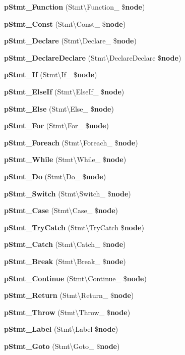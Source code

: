 \begin{DoxyCompactItemize}
\item 
{\bf p\+Stmt\+\_\+\+Function} (Stmt\textbackslash{}\+Function\+\_\+ \${\bf node})
\item 
{\bf p\+Stmt\+\_\+\+Const} (Stmt\textbackslash{}\+Const\+\_\+ \${\bf node})
\item 
{\bf p\+Stmt\+\_\+\+Declare} (Stmt\textbackslash{}\+Declare\+\_\+ \${\bf node})
\item 
{\bf p\+Stmt\+\_\+\+Declare\+Declare} (Stmt\textbackslash{}\+Declare\+Declare \${\bf node})
\item 
{\bf p\+Stmt\+\_\+\+If} (Stmt\textbackslash{}\+If\+\_\+ \${\bf node})
\item 
{\bf p\+Stmt\+\_\+\+Else\+If} (Stmt\textbackslash{}\+Else\+If\+\_\+ \${\bf node})
\item 
{\bf p\+Stmt\+\_\+\+Else} (Stmt\textbackslash{}\+Else\+\_\+ \${\bf node})
\item 
{\bf p\+Stmt\+\_\+\+For} (Stmt\textbackslash{}\+For\+\_\+ \${\bf node})
\item 
{\bf p\+Stmt\+\_\+\+Foreach} (Stmt\textbackslash{}\+Foreach\+\_\+ \${\bf node})
\item 
{\bf p\+Stmt\+\_\+\+While} (Stmt\textbackslash{}\+While\+\_\+ \${\bf node})
\item 
{\bf p\+Stmt\+\_\+\+Do} (Stmt\textbackslash{}\+Do\+\_\+ \${\bf node})
\item 
{\bf p\+Stmt\+\_\+\+Switch} (Stmt\textbackslash{}\+Switch\+\_\+ \${\bf node})
\item 
{\bf p\+Stmt\+\_\+\+Case} (Stmt\textbackslash{}\+Case\+\_\+ \${\bf node})
\item 
{\bf p\+Stmt\+\_\+\+Try\+Catch} (Stmt\textbackslash{}\+Try\+Catch \${\bf node})
\item 
{\bf p\+Stmt\+\_\+\+Catch} (Stmt\textbackslash{}\+Catch\+\_\+ \${\bf node})
\item 
{\bf p\+Stmt\+\_\+\+Break} (Stmt\textbackslash{}\+Break\+\_\+ \${\bf node})
\item 
{\bf p\+Stmt\+\_\+\+Continue} (Stmt\textbackslash{}\+Continue\+\_\+ \${\bf node})
\item 
{\bf p\+Stmt\+\_\+\+Return} (Stmt\textbackslash{}\+Return\+\_\+ \${\bf node})
\item 
{\bf p\+Stmt\+\_\+\+Throw} (Stmt\textbackslash{}\+Throw\+\_\+ \${\bf node})
\item 
{\bf p\+Stmt\+\_\+\+Label} (Stmt\textbackslash{}\+Label \${\bf node})
\item 
{\bf p\+Stmt\+\_\+\+Goto} (Stmt\textbackslash{}\+Goto\+\_\+ \${\bf node})

\end{DoxyCompactItemize}

